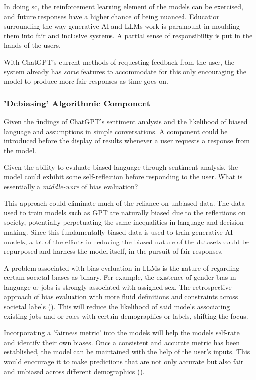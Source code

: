 \documentclass[12pt]{article}
\begin{document}
In doing so, the reinforcement learning element of the models can be exercised, and future responses have a higher chance of being nuanced. Education surrounding the way generative AI and LLMs work is paramount in moulding them into fair and inclusive systems. A partial sense of responsibility is put in the hands of the users. 

With ChatGPT's current methods of requesting feedback from the user, the system already has \textit{some} features to accommodate for this only encouraging the model to produce more fair responses as time goes on.

\subsubsection{'Debiasing' Algorithmic Component}

Given the findings of ChatGPT's sentiment analysis and the likelihood of biased language and assumptions in simple conversations. A component could be introduced before the display of results whenever a user requests a response from the model.

Given the ability to evaluate biased language through sentiment analysis, the model could exhibit some self-reflection before responding to the user. What is essentially a \textit{middle-ware} of bias evaluation?

This approach could eliminate much of the reliance on unbiased data. The data used to train models such as GPT are naturally biased due to the reflections on society, potentially perpetuating the same inequalities in language and decision-making. Since this fundamentally biased data is used to train generative AI models, a lot of the efforts in reducing the biased nature of the datasets could be repurposed and harness the model itself, in the pursuit of fair responses.

A problem associated with bias evaluation in LLMs is the nature of regarding certain societal biases as binary. For example, the existence of gender bias in language or jobs is strongly associated with assigned sex. The retrospective approach of bias evaluation with more fluid definitions and constraints across societal labels (\cite{stanczak-2021}). This will reduce the likelihood of said models associating existing jobs and or roles with certain demographics or labels, shifting the focus.

Incorporating a 'fairness metric' into the models will help the models self-rate and identify their own biases. Once a consistent and accurate metric has been established, the model can be maintained with the help of the user's inputs. This would encourage it to make predictions that are not only accurate but also fair and unbiased across different demographics (\cite{limisiewicz-2023}). 
\end{document}
